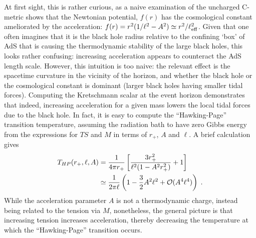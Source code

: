 \documentclass[
twoside,
openright,
frontopenright,
]{dmathesis}
\newcommand{\nn}{\nonumber}
\begin{document}
At first sight, this is rather curious, as a naive examination of the uncharged
C-metric shows that the Newtonian potential, $f(r)$ has the cosmological
constant ameliorated by the acceleration:
$f(r) = r^2 (1 / \ell^2 - A^2) \simeq r^2/\ell_{\rm eff}^2$. Given that one
often imagines that it is the black hole radius relative to the confining `box'
of AdS that is causing the thermodynamic stability of the large black holes,
this looks rather confusing: increasing acceleration appears to counteract the
AdS length scale. However, this intuition is too naive: the relevant effect is
the spacetime curvature in the vicinity of the horizon, and whether the black
hole or the cosmological constant is dominant (larger black holes having smaller
tidal forces). Computing the Kretschmann scalar at the event horizon
demonstrates that indeed, increasing acceleration for a given mass lowers the
local tidal forces due to the black hole.  In fact, it is easy to compute the
``Hawking-Page'' transition temperature, assuming the radiation bath to have
zero Gibbs energy from the expressions for $TS$ and $M$ in terms of $r_+$, $A$
and $\ell$. A brief calculation gives
\begin{align}
T_{HP} (r_+, \ell, A) &= \frac{1}{4\pi r_+ }\left [
\frac{ 3r_+^2}{\ell^2 ( 1- A^2 r_+^2) } + 1 \right ]\nn\\
& \simeq \frac{1}{2\pi \ell} \left ( 1 - \frac32 A^2 \ell^2 + {\cal{O}} (A^4 \ell^4) \right)
\;.
\end{align}
While the acceleration parameter $A$ is not a thermodynamic charge, instead
being related to the tension via $M$, nonetheless, the general picture is that
increasing tension increases acceleration, thereby decreasing the temperature at
which the ``Hawking-Page'' transition occurs.
\end{document}
